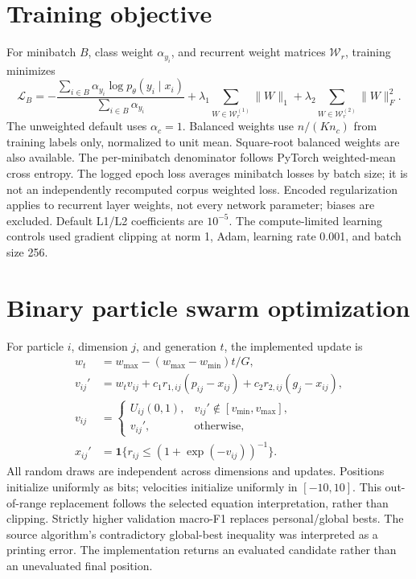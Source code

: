 \documentclass[11pt,a4paper]{report}
\begin{document}
\section{Training objective}
For minibatch $B$, class weight $\alpha_{y_i}$, and recurrent weight matrices $\mathcal W_r$, training minimizes
\begin{equation}
 \mathcal L_B=-\frac{\sum_{i\in B}\alpha_{y_i}\log p_\theta(y_i\mid x_i)}{\sum_{i\in B}\alpha_{y_i}}
 +\lambda_1\!\sum_{W\in\mathcal W_r^{(1)}}\!\|W\|_1
 +\lambda_2\!\sum_{W\in\mathcal W_r^{(2)}}\!\|W\|_F^2.
\end{equation}
The unweighted default uses $\alpha_c=1$. Balanced weights use $n/(K n_c)$ from training labels only, normalized to unit mean. Square-root balanced weights are also available. The per-minibatch denominator follows PyTorch weighted-mean cross entropy. The logged epoch loss averages minibatch losses by batch size; it is not an independently recomputed corpus weighted loss. Encoded regularization applies to recurrent layer weights, not every network parameter; biases are excluded. Default L1/L2 coefficients are $10^{-5}$. The compute-limited learning controls used gradient clipping at norm 1, Adam, learning rate 0.001, and batch size 256.

\section{Binary particle swarm optimization}
For particle $i$, dimension $j$, and generation $t$, the implemented update is
\begin{align}
 w_t&=w_{\max}-(w_{\max}-w_{\min})t/G,\\
 v_{ij}'&=w_tv_{ij}+c_1r_{1,ij}(p_{ij}-x_{ij})+c_2r_{2,ij}(g_j-x_{ij}),\\
 v_{ij}&=\begin{cases}U_{ij}(0,1),&v_{ij}'\notin[v_{\min},v_{\max}],\\v_{ij}',&\text{otherwise},\end{cases}\\
 x_{ij}'&=\mathbf{1}\{r_{ij}\leq (1+\exp(-v_{ij}))^{-1}\}.
\end{align}
All random draws are independent across dimensions and updates. Positions initialize uniformly as bits; velocities initialize uniformly in $[-10,10]$. This out-of-range replacement follows the selected equation interpretation, rather than clipping. Strictly higher validation macro-F1 replaces personal/global bests. The source algorithm's contradictory global-best inequality was interpreted as a printing error. The implementation returns an evaluated candidate rather than an unevaluated final position.
\end{document}
